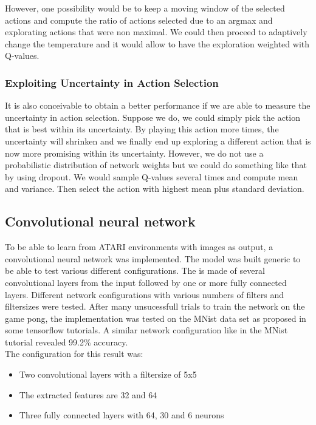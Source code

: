 \documentclass[10pt,a4paper]{article}
\begin{document}
However, one possibility would be to keep a moving window of the selected actions and compute the ratio of actions selected due to an argmax and explorating actions that were non maximal. We could then proceed to adaptively change the temperature and it would allow to have the exploration weighted with Q-values.

\subsubsection{Exploiting Uncertainty in Action Selection}
It is also conceivable to obtain a better performance if we are able to measure the uncertainty in action selection. Suppose we do, we could simply pick the action that is best within its uncertainty. By playing this action more times, the uncertainty will shrinken and we finally end up exploring a different action that is now more promising within its uncertainty. However, we do not use a probabilistic distribution of network weights but we could do something like that by using dropout. We would sample Q-values several times and compute mean and variance. Then select the action with highest mean plus standard deviation.

\subsection{Convolutional neural network}
To be able to learn from ATARI environments with images as output, a convolutional neural network was implemented. The model was built generic to be able to test various different configurations. The is made of several convolutional layers from the input followed by one or more fully connected layers. Different network configurations with various numbers of filters and filtersizes were tested.
After many unsucessfull trials to train the network on the game pong, the implementation was tested on the MNist data set as proposed in some tensorflow tutorials. A similar network configuration like in the MNist tutorial revealed 99.2\% accuracy.\\

\noindent The configuration for this result was:
\begin{itemize}
\item Two convolutional layers with a filtersize of 5x5
\item The extracted features are 32 and 64
\item Three fully connected layers with 64, 30 and 6 neurons
\end{itemize} 
\end{document}
